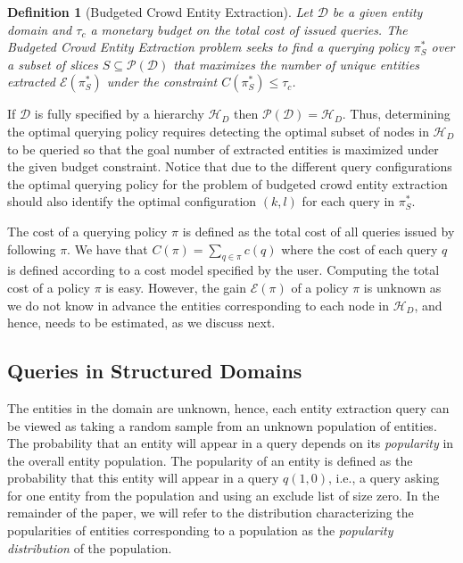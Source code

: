 \documentclass{vldb}
\newtheorem{definition}{Definition}
\newcommand{\domain}{\mathcal{D}}
\newcommand{\hierarchy}{\mathcal{H}_D}
\newcommand{\uentities}{\mathcal{E}}
\begin{document}
\begin{definition}[Budgeted Crowd Entity Extraction]
Let $\domain$ be a given entity domain and $\tau_c$ a monetary budget on the total cost of issued queries. The Budgeted Crowd Entity Extraction problem seeks to find 
a querying policy $\pi^*_S$ over a subset of slices $S \subseteq \mathcal{P}(\domain)$ that maximizes the number of unique entities extracted $\uentities(\pi^*_S)$ under the constraint $C(\pi^*_S) \leq \tau_c$.
\end{definition}

If $\domain$ is fully specified by a hierarchy $\hierarchy$ then $\mathcal{P}(\domain) = \hierarchy$. Thus, determining the optimal querying policy requires detecting the optimal subset of nodes in $\hierarchy$ to be queried so that the goal number of extracted entities is maximized under the given budget constraint. Notice that due to the different query configurations the optimal querying policy for the problem of budgeted crowd entity extraction should also identify the optimal configuration $(k,l)$ for each query in $\pi^*_S$.

The cost of a querying policy $\pi$ is defined as the total cost of all queries issued by following $\pi$. We have that $C(\pi) = \sum_{q \in \pi} c(q)$ where the cost of each query $q$ is defined according to a cost model specified by the user. Computing the total cost of a policy $\pi$ is easy. However, the gain $\uentities(\pi)$ of a policy $\pi$ is unknown as we do not know in advance the entities corresponding to each node in $\hierarchy$, and hence, needs to be estimated, as we discuss next. 

\subsection{Queries in Structured Domains}
\label{sec:sampling}
The entities in the domain are unknown, hence, each entity extraction query can be viewed as taking a random sample from an unknown population of entities. The probability that an entity will appear in a query depends on its {\em popularity} in the overall entity population. The popularity of an entity is defined as the probability that this entity will appear in a query $q(1,0)$, i.e., a query asking for one entity from the population and using an exclude list of size zero. In the remainder of the paper, we will refer to the distribution characterizing the popularities of entities corresponding to a population as the {\em popularity distribution} of the population. 
\end{document}

